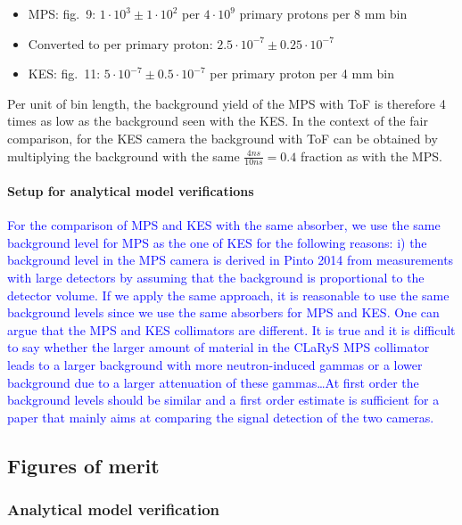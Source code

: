 \documentclass[a4paper,english]{article}
\newcommand{\tcb}[1]{\textcolor{blue}{#1}}
\begin{document}
\begin{itemize}[noitemsep]
\item MPS: \cite{Pinto2014a} fig.~9: $1 \cdot 10^{3} \pm 1 \cdot 10^{2}$ per $4\cdot10^9$ primary protons per 8 mm bin
\item[] Converted to per primary proton: $2.5 \cdot 10^{-7} \pm 0.25 \cdot 10^{-7}$
\item KES: \cite{Perali2014} fig.~11: $5 \cdot 10^{-7} \pm 0.5 \cdot 10^{-7}$ per primary proton per 4 mm bin
\end{itemize}

Per unit of bin length, the background yield of the MPS with ToF is therefore 4 times as low as the background seen with the KES. In the context of the fair comparison, for the KES camera the background with ToF can be obtained by multiplying the background with the same $\frac{4 ns}{10 ns} = 0.4$ fraction as with the MPS.

\paragraph{Setup for analytical model verifications}

\tcb{For the comparison of MPS and KES with the same absorber, we use the same background level for MPS as the one of KES for the following reasons: i) the background level in the MPS camera is derived in Pinto 2014 from measurements with large detectors by assuming that the background is proportional to the detector volume. If we apply the same approach, it is reasonable to use the same background levels since we use the same absorbers for MPS and KES. One can argue that the MPS and KES collimators are different. It is true and it is difficult to say whether the larger amount of material in the CLaRyS MPS collimator leads to a larger background with more neutron-induced gammas or a lower background due to a larger attenuation of these gammas\dots At first order the background levels should be similar and a first order estimate is sufficient for a paper that mainly aims at comparing the signal detection of the two cameras.}



\subsection{Figures of merit}\label{figmerit}


\subsubsection{Analytical model verification}
\end{document}
